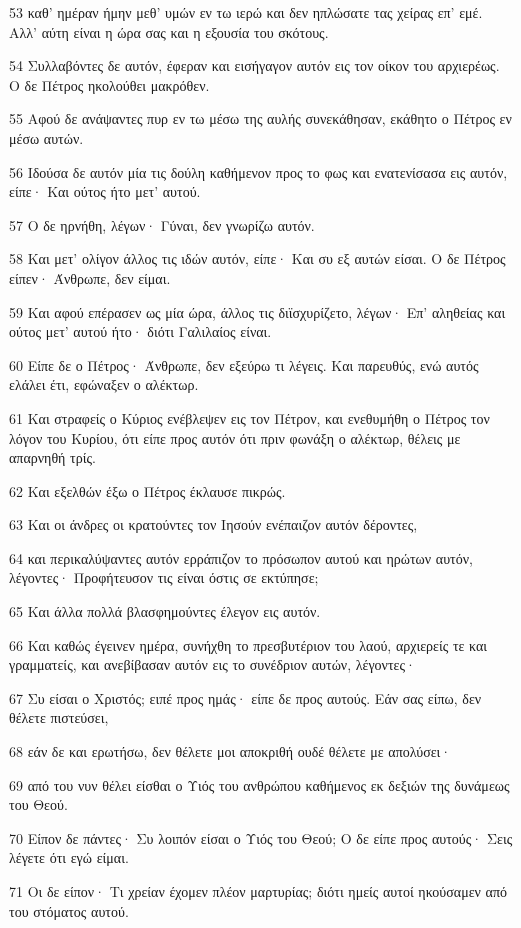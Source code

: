 \par 53 καθ' ημέραν ήμην μεθ' υμών εν τω ιερώ και δεν ηπλώσατε τας χείρας επ' εμέ. Αλλ' αύτη είναι η ώρα σας και η εξουσία του σκότους.
\par 54 Συλλαβόντες δε αυτόν, έφεραν και εισήγαγον αυτόν εις τον οίκον του αρχιερέως. Ο δε Πέτρος ηκολούθει μακρόθεν.
\par 55 Αφού δε ανάψαντες πυρ εν τω μέσω της αυλής συνεκάθησαν, εκάθητο ο Πέτρος εν μέσω αυτών.
\par 56 Ιδούσα δε αυτόν μία τις δούλη καθήμενον προς το φως και ενατενίσασα εις αυτόν, είπε· Και ούτος ήτο μετ' αυτού.
\par 57 Ο δε ηρνήθη, λέγων· Γύναι, δεν γνωρίζω αυτόν.
\par 58 Και μετ' ολίγον άλλος τις ιδών αυτόν, είπε· Και συ εξ αυτών είσαι. Ο δε Πέτρος είπεν· Άνθρωπε, δεν είμαι.
\par 59 Και αφού επέρασεν ως μία ώρα, άλλος τις διϊσχυρίζετο, λέγων· Επ' αληθείας και ούτος μετ' αυτού ήτο· διότι Γαλιλαίος είναι.
\par 60 Είπε δε ο Πέτρος· Άνθρωπε, δεν εξεύρω τι λέγεις. Και παρευθύς, ενώ αυτός ελάλει έτι, εφώναξεν ο αλέκτωρ.
\par 61 Και στραφείς ο Κύριος ενέβλεψεν εις τον Πέτρον, και ενεθυμήθη ο Πέτρος τον λόγον του Κυρίου, ότι είπε προς αυτόν ότι πριν φωνάξη ο αλέκτωρ, θέλεις με απαρνηθή τρίς.
\par 62 Και εξελθών έξω ο Πέτρος έκλαυσε πικρώς.
\par 63 Και οι άνδρες οι κρατούντες τον Ιησούν ενέπαιζον αυτόν δέροντες,
\par 64 και περικαλύψαντες αυτόν ερράπιζον το πρόσωπον αυτού και ηρώτων αυτόν, λέγοντες· Προφήτευσον τις είναι όστις σε εκτύπησε;
\par 65 Και άλλα πολλά βλασφημούντες έλεγον εις αυτόν.
\par 66 Και καθώς έγεινεν ημέρα, συνήχθη το πρεσβυτέριον του λαού, αρχιερείς τε και γραμματείς, και ανεβίβασαν αυτόν εις το συνέδριον αυτών, λέγοντες·
\par 67 Συ είσαι ο Χριστός; ειπέ προς ημάς· είπε δε προς αυτούς. Εάν σας είπω, δεν θέλετε πιστεύσει,
\par 68 εάν δε και ερωτήσω, δεν θέλετε μοι αποκριθή ουδέ θέλετε με απολύσει·
\par 69 από του νυν θέλει είσθαι ο Υιός του ανθρώπου καθήμενος εκ δεξιών της δυνάμεως του Θεού.
\par 70 Είπον δε πάντες· Συ λοιπόν είσαι ο Υιός του Θεού; Ο δε είπε προς αυτούς· Σεις λέγετε ότι εγώ είμαι.
\par 71 Οι δε είπον· Τι χρείαν έχομεν πλέον μαρτυρίας; διότι ημείς αυτοί ηκούσαμεν από του στόματος αυτού.

